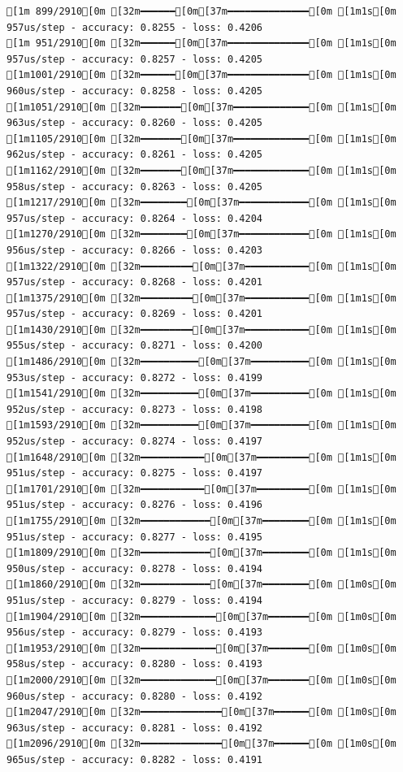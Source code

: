 \documentclass[
  letterpaper,
  DIV=11,
  numbers=noendperiod]{scrartcl}
\begin{document}
\begin{verbatim}
[1m 899/2910[0m [32m━━━━━━[0m[37m━━━━━━━━━━━━━━[0m [1m1s[0m 957us/step - accuracy: 0.8255 - loss: 0.4206
[1m 951/2910[0m [32m━━━━━━[0m[37m━━━━━━━━━━━━━━[0m [1m1s[0m 957us/step - accuracy: 0.8257 - loss: 0.4205
[1m1001/2910[0m [32m━━━━━━[0m[37m━━━━━━━━━━━━━━[0m [1m1s[0m 960us/step - accuracy: 0.8258 - loss: 0.4205
[1m1051/2910[0m [32m━━━━━━━[0m[37m━━━━━━━━━━━━━[0m [1m1s[0m 963us/step - accuracy: 0.8260 - loss: 0.4205
[1m1105/2910[0m [32m━━━━━━━[0m[37m━━━━━━━━━━━━━[0m [1m1s[0m 962us/step - accuracy: 0.8261 - loss: 0.4205
[1m1162/2910[0m [32m━━━━━━━[0m[37m━━━━━━━━━━━━━[0m [1m1s[0m 958us/step - accuracy: 0.8263 - loss: 0.4205
[1m1217/2910[0m [32m━━━━━━━━[0m[37m━━━━━━━━━━━━[0m [1m1s[0m 957us/step - accuracy: 0.8264 - loss: 0.4204
[1m1270/2910[0m [32m━━━━━━━━[0m[37m━━━━━━━━━━━━[0m [1m1s[0m 956us/step - accuracy: 0.8266 - loss: 0.4203
[1m1322/2910[0m [32m━━━━━━━━━[0m[37m━━━━━━━━━━━[0m [1m1s[0m 957us/step - accuracy: 0.8268 - loss: 0.4201
[1m1375/2910[0m [32m━━━━━━━━━[0m[37m━━━━━━━━━━━[0m [1m1s[0m 957us/step - accuracy: 0.8269 - loss: 0.4201
[1m1430/2910[0m [32m━━━━━━━━━[0m[37m━━━━━━━━━━━[0m [1m1s[0m 955us/step - accuracy: 0.8271 - loss: 0.4200
[1m1486/2910[0m [32m━━━━━━━━━━[0m[37m━━━━━━━━━━[0m [1m1s[0m 953us/step - accuracy: 0.8272 - loss: 0.4199
[1m1541/2910[0m [32m━━━━━━━━━━[0m[37m━━━━━━━━━━[0m [1m1s[0m 952us/step - accuracy: 0.8273 - loss: 0.4198
[1m1593/2910[0m [32m━━━━━━━━━━[0m[37m━━━━━━━━━━[0m [1m1s[0m 952us/step - accuracy: 0.8274 - loss: 0.4197
[1m1648/2910[0m [32m━━━━━━━━━━━[0m[37m━━━━━━━━━[0m [1m1s[0m 951us/step - accuracy: 0.8275 - loss: 0.4197
[1m1701/2910[0m [32m━━━━━━━━━━━[0m[37m━━━━━━━━━[0m [1m1s[0m 951us/step - accuracy: 0.8276 - loss: 0.4196
[1m1755/2910[0m [32m━━━━━━━━━━━━[0m[37m━━━━━━━━[0m [1m1s[0m 951us/step - accuracy: 0.8277 - loss: 0.4195
[1m1809/2910[0m [32m━━━━━━━━━━━━[0m[37m━━━━━━━━[0m [1m1s[0m 950us/step - accuracy: 0.8278 - loss: 0.4194
[1m1860/2910[0m [32m━━━━━━━━━━━━[0m[37m━━━━━━━━[0m [1m0s[0m 951us/step - accuracy: 0.8279 - loss: 0.4194
[1m1904/2910[0m [32m━━━━━━━━━━━━━[0m[37m━━━━━━━[0m [1m0s[0m 956us/step - accuracy: 0.8279 - loss: 0.4193
[1m1953/2910[0m [32m━━━━━━━━━━━━━[0m[37m━━━━━━━[0m [1m0s[0m 958us/step - accuracy: 0.8280 - loss: 0.4193
[1m2000/2910[0m [32m━━━━━━━━━━━━━[0m[37m━━━━━━━[0m [1m0s[0m 960us/step - accuracy: 0.8280 - loss: 0.4192
[1m2047/2910[0m [32m━━━━━━━━━━━━━━[0m[37m━━━━━━[0m [1m0s[0m 963us/step - accuracy: 0.8281 - loss: 0.4192
[1m2096/2910[0m [32m━━━━━━━━━━━━━━[0m[37m━━━━━━[0m [1m0s[0m 965us/step - accuracy: 0.8282 - loss: 0.4191

\end{verbatim}
\end{document}
